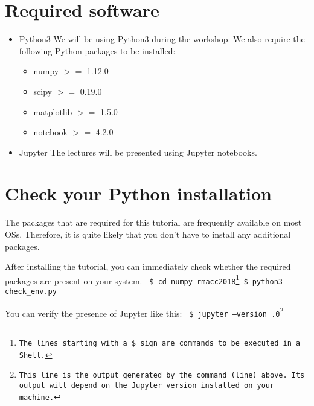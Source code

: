 \documentclass[11pt]{article}
\begin{document}
\section{Required software}
\begin{itemize}
  \item Python$3$ \newline
        We will be using Python$3$ during the workshop.
        We also require the following Python packages to be installed:
        \begin{itemize}
           \item numpy $>=$ 1.12.0 
           \item scipy $>=$ 0.19.0
           \item matplotlib $>=$ 1.5.0
           \item notebook $>=$ 4.2.0
        \end{itemize} 

  \item Jupyter \newline
        The lectures will be presented using Jupyter notebooks.
\end{itemize}


\section{Check your Python installation}\label{section:check}
The packages that are required for this tutorial are frequently available 
on most OSs.
Therefore, it is quite likely that you don't have to install any additional packages.

After installing the tutorial, you can immediately check whether the required packages 
are present on your system. \newline\newline
\texttt{
\$ cd numpy-rmacc2018\footnote{The lines starting with a \$ sign are commands to be executed in a Shell.} \newline
\$ python3 check\_env.py\newline
}

You can verify the presence of Jupyter like this:\newline\newline
\texttt{
\$ jupyter --version .0\footnote{This line is the output generated by the command (line) above.
Its output will depend on the Jupyter version installed on your machine.}\newline
}
\end{document}
